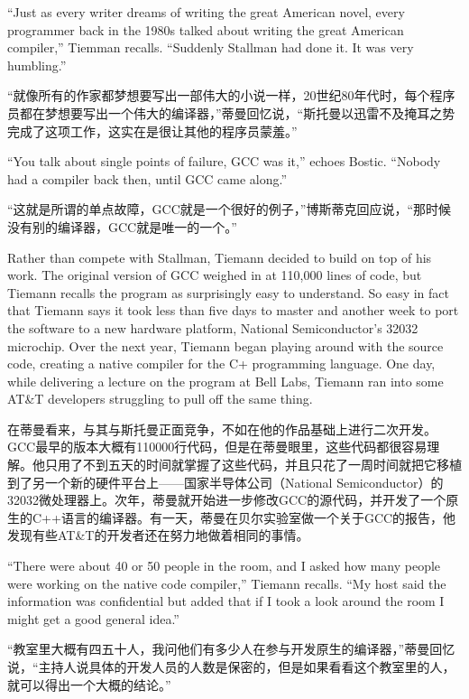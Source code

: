 \ifdefined\eng
``Just as every writer dreams of writing the great American novel, every programmer back in the 1980s talked about writing the great American compiler,'' Tiemman recalls. ``Suddenly Stallman had done it. It was very humbling.''
\fi

\ifdefined\chs
``就像所有的作家都梦想要写出一部伟大的小说一样，20世纪80年代时，每个程序员都在梦想要写出一个伟大的编译器，''蒂曼回忆说，``斯托曼以迅雷不及掩耳之势完成了这项工作，这实在是很让其他的程序员蒙羞。''
\fi

\ifdefined\eng
``You talk about single points of failure, GCC was it,'' echoes Bostic. ``Nobody had a compiler back then, until GCC came along.''
\fi

\ifdefined\chs
``这就是所谓的单点故障，GCC就是一个很好的例子，''博斯蒂克回应说，``那时候没有别的编译器，GCC就是唯一的一个。''
\fi

\ifdefined\eng
Rather than compete with Stallman, Tiemann decided to build on top of his work. The original version of GCC weighed in at 110,000 lines of code, but Tiemann recalls the program as surprisingly easy to understand. So easy in fact that Tiemann says it took less than five days to master and another week to port the software to a new hardware platform, National Semiconductor's 32032 microchip. Over the next year, Tiemann began playing around with the source code, creating a native compiler for the C+ programming language. One day, while delivering a lecture on the program at Bell Labs, Tiemann ran into some AT\&T developers struggling to pull off the same thing.
\fi

\ifdefined\chs
在蒂曼看来，与其与斯托曼正面竞争，不如在他的作品基础上进行二次开发。GCC最早的版本大概有110000行代码，但是在蒂曼眼里，这些代码都很容易理解。他只用了不到五天的时间就掌握了这些代码，并且只花了一周时间就把它移植到了另一个新的硬件平台上——国家半导体公司（National Semiconductor）的32032微处理器上。次年，蒂曼就开始进一步修改GCC的源代码，并开发了一个原生的C++语言的编译器。有一天，蒂曼在贝尔实验室做一个关于GCC的报告，他发现有些AT\&T的开发者还在努力地做着相同的事情。
\fi

\ifdefined\eng
``There were about 40 or 50 people in the room, and I asked how many people were working on the native code compiler,'' Tiemann recalls. ``My host said the information was confidential but added that if I took a look around the room I might get a good general idea.''
\fi

\ifdefined\chs
``教室里大概有四五十人，我问他们有多少人在参与开发原生的编译器，''蒂曼回忆说，``主持人说具体的开发人员的人数是保密的，但是如果看看这个教室里的人，就可以得出一个大概的结论。''
\fi

